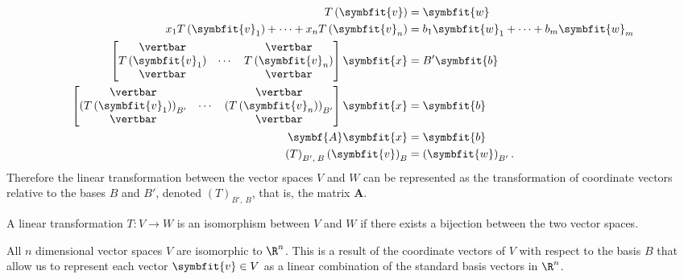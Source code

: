 \documentclass{article}
\begin{document}
\begin{align*}
    T\left( \symbfit{v} \right)                                                                                       & = \symbfit{w}                                    \\
    x_1 T\left( \symbfit{v}_1 \right) + \cdots + x_n T\left( \symbfit{v}_n \right)                                    & = b_1 \symbfit{w}_1 + \cdots + b_m \symbfit{w}_m \\
    \begin{bmatrix}
        \vertbar                      &        & \vertbar                      \\
        T\left( \symbfit{v}_1 \right) & \cdots & T\left( \symbfit{v}_n \right) \\
        \vertbar                      &        & \vertbar
    \end{bmatrix} \symbfit{x}                                         & = B' \symbfit{b}                                                                                 \\
    \begin{bmatrix}
        \vertbar                                          &        & \vertbar                                          \\
        \left( T\left( \symbfit{v}_1 \right) \right)_{B'} & \cdots & \left( T\left( \symbfit{v}_n \right) \right)_{B'} \\
        \vertbar                                          &        & \vertbar
    \end{bmatrix} \symbfit{x} & = \symbfit{b}                                                       \\
    \symbf{A} \symbfit{x}                                                                                             & = \symbfit{b}                                    \\
    \left( T \right)_{B',\: B} \left( \symbfit{v} \right)_B                                                           & = \left( \symbfit{w} \right)_{B'}.
\end{align*}
Therefore the linear transformation between the vector spaces \(V\) and \(W\)
can be represented as the transformation of coordinate vectors relative to the bases \(B\) and \(B'\), denoted \(\left( T \right)_{B',\: B}\), that is, the matrix \(\symbf{A}\).
\begin{definition}[Isomorphism]
    A linear transformation \(T : V \to W\) is an isomorphism between \(V\) and \(W\) if there exists a bijection between the two vector spaces.

    All \(n\) dimensional vector spaces \(V\) are isomorphic to \(\R^n\). This is a result of the coordinate vectors of \(V\) with respect
    to the basis \(B\) that allow us to represent each vector \(\symbfit{v} \in V\) as a linear combination of the standard basis vectors in \(\R^n\).
\end{definition}
\end{document}
